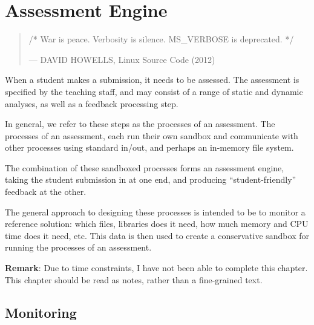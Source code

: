 
\chapter{Assessment Engine}

\label{section:assessment-engine}

\begin{quotation}

\footnotesize\sffamily\itshape

\begin{flushright}

/* War is peace. Verbosity is silence. MS\_VERBOSE is deprecated. */

\smallbreak

\upshape

--- DAVID HOWELLS, Linux Source Code (2012)

\end{flushright}

\end{quotation}

When a student makes a submission, it needs to be assessed. The
assessment is specified by the teaching staff, and may consist of a range of
static and dynamic analyses, as well as a feedback processing step.

In general, we refer to these steps as the processes of an assessment. The
processes of an assessment, each run their own sandbox and communicate with
other processes using standard in/out, and perhaps an in-memory file system. 

The combination of these sandboxed processes forms an assessment engine, taking
the student submission in at one end, and producing ``student-friendly''
feedback at the other.

The general approach to designing these processes is intended to be to monitor
a reference solution: which files, libraries does it need, how much memory and
CPU time does it need, etc. This data is then used to create a conservative
sandbox for running the processes of an assessment.

\textbf{Remark}: Due to time constraints, I have not been able to complete this
chapter. This chapter should be read as notes, rather than a fine-grained text.

\section{Monitoring}

